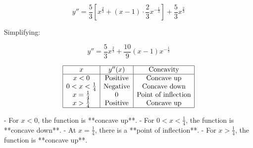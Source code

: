 \documentclass{article}
\begin{document}
		\[
		y'' = \frac{5}{3} \left[ x^{\frac{2}{3}} + (x - 1) \cdot \frac{2}{3} x^{-\frac{1}{3}} \right] + \frac{5}{3} x^{\frac{2}{3}}
		\]
		
		Simplifying:
		
		\[
		y'' = \frac{5}{3} x^{\frac{2}{3}} + \frac{10}{9} (x - 1) x^{-\frac{1}{3}}
		\]
		
		\[
		\begin{array}{|c|c|c|}
			\hline
			x & y''(x) & \text{Concavity} \\
			\hline
			x < 0 & \text{Positive} & \text{Concave up} \\
			0 < x < \frac{1}{4} & \text{Negative} & \text{Concave down} \\
			x = \frac{1}{4} & 0 & \text{Point of inflection} \\
			x > \frac{1}{4} & \text{Positive} & \text{Concave up} \\
			\hline
		\end{array}
		\]
		
			- For \( x < 0 \), the function is **concave up**.
		- For \( 0 < x < \frac{1}{4} \), the function is **concave down**.
		- At \( x = \frac{1}{4} \), there is a **point of inflection**.
		- For \( x > \frac{1}{4} \), the function is **concave up**.
		

	
	
\end{document}
